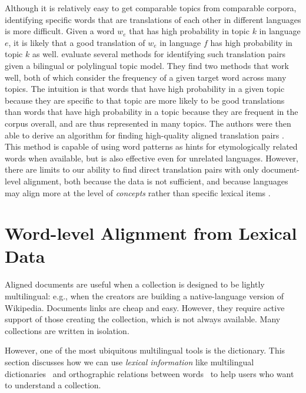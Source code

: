 Although it is relatively easy to get comparable topics from comparable corpora, identifying specific words that are translations of each other in different languages is more difficult.
Given a word $w_e$ that has high probability in topic $k$ in language $e$, it is likely that a good translation of $w_e$ in language $f$ has high probability in topic $k$ as well. \citet{vulic2011identifying} evaluate several methods for identifying such translation pairs given a bilingual or polylingual topic model.
They find two methods that work well, both of which consider the frequency of a given target word across many topics.
The intuition is that words that have high probability in a given topic because they are specific to that topic are more likely to be good translations than words that have high probability in a topic because they are frequent in the corpus overall, and are thus represented in many topics.
The authors were then able to derive an algorithm for finding high-quality aligned translation pairs \citep{vulic2012detecting}. This method is capable of using word patterns as hints for etymologically related words when available, but is also effective even for unrelated languages.
However, there are limits to our ability to find direct translation pairs with only document-level alignment, both because the data is not sufficient, and because languages may align more at the level of {\em concepts} rather than specific lexical items \citep{vulic2014probabilistic}.

\section{Word-level Alignment from Lexical Data}

Aligned documents are useful when a collection is designed to be
lightly multilingual: e.g., when the creators are building a
native-language version of Wikipedia.  Documents links
are cheap and easy. However, they require active support of those creating the
collection, which is not always available.  Many collections are
written in isolation.

However, one of the most ubiquitous multilingual tools is the
dictionary.  This section discusses how we can use \emph{lexical information} like
multilingual dictionaries~\citep{Zhang-10} and orthographic relations 
between words~\citep{boyd-graber-09} to help users
who want to understand a collection.

